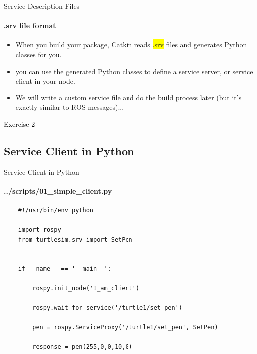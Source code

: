 \documentclass{beamer}
\begin{document}
\begin{frame}{Service Description Files}
    \framesubtitle{.srv file format}
    \begin{itemize}
        \item When you build your package, Catkin reads {\ttfamily \colorbox{yellow}{.srv}} files and generates Python classes for you.
        \vspace{5mm}
        \item you can use the generated Python classes to define a service server, or service client in your node.
        \vspace{5mm}
        \item We will write a custom service file and do the build process later (but it's exactly similar to ROS messages)...
    \end{itemize}      
\end{frame}


\begin{frame}[plain]{}  
    \centering
    {\huge \textcolor{black}{Exercise 2}}
\end{frame}




\subsection{Service Client in Python}

\begin{frame}[fragile]{Service Client in Python}
    \framesubtitle{   ../scripts/01\_simple\_client.py}
    \begin{lstlisting}
    #!/usr/bin/env python
    
    import rospy
    from turtlesim.srv import SetPen
    
    
    if __name__ == '__main__':
    
        rospy.init_node('I_am_client') 
        
        rospy.wait_for_service('/turtle1/set_pen')
        
        pen = rospy.ServiceProxy('/turtle1/set_pen', SetPen)
        
        response = pen(255,0,0,10,0)

    \end{lstlisting}
\end{frame}
\end{document}
